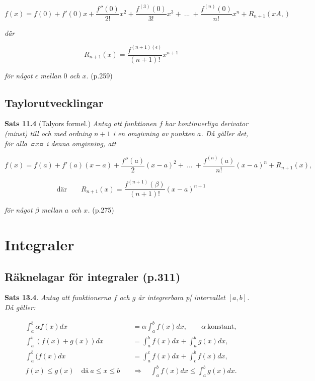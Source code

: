 \documentclass[11pt]{article}
\begin{document}
\begin{equation}
    f(x) = f(0) + f'(0)x + \frac{f''(0)}{2!}x^2 + \frac{f^{(3)}(0)}{3!}x^3 +\ ...\ + \frac{f^{(n)}(0)}{n!}x^n + R_{n + 1}(xA,)
    \label{eq:maclaurinpolynom_och_rest}
\end{equation}

\textit{där}


\begin{equation}
    R_{n + 1}(x) = \frac{f^{(n + 1)(\epsilon)}}{(n +  1)!}x^{n + 1}
    \label{eq:maclaurinpolynom_rest}
\end{equation}

\textit{för något $\epsilon$ mellan $0$ och $x$}. (p.259)

\subsection{Taylorutvecklingar}

\textbf{Sats 11.4} (Talyors formel.) \textit{Antag att funktionen $f$ har kontinuerliga derivator (minst) till och med ordning $n + 1$ i en omgivning av punkten $a$. Då gäller det, för alla ¤x¤ i denna omgivning, att}

\begin{equation}
    f(x) = f(a) + f'(a)(x - a) + \frac{f''(a)}{2}(x - a)^2 +\ ...\ + \frac{f^{(n)}(a)}{n!}(x - a)^n + R_{n + 1}(x),
\end{equation}

\begin{equation}
    \text{där}\qquad R_{n + 1}(x) = \frac{f^{(n + 1)}(\beta)}{(n + 1)!}(x - a)^{n + 1}
\end{equation}

\textit{för något $\beta$ mellan $a$ och $x$.} (p.275)

\section{Integraler}

\subsection{Räknelagar för integraler (p.311)}

\textbf{Sats 13.4}. \textit{Antag att funktionerna $f$ och $g$ är integrerbara p[ intervallet $[a, b]$. Då gäller:}

\begin{align}
    \int_a^b{\alpha f(x)} dx &= \alpha \int_a^b{f(x)} dx, \qquad \alpha\ \text{konstant},\\
    \int_a^b{(f(x) + g(x))} dx &= \int_a^b{f(x)} dx + \int_a^b{g(x)} dx,\\
    \int_a^b{(f(x)} dx &= \int_a^c{f(x)} dx + \int_c^b{f(x)} dx,\\
    f(x) \leq g(x) \quad \text{då}\ a \leq x \leq b \quad &\Rightarrow \quad \int_a^b{f(x)} dx \leq \int_a^b{g(x)} dx.
\end{align}
\end{document}

